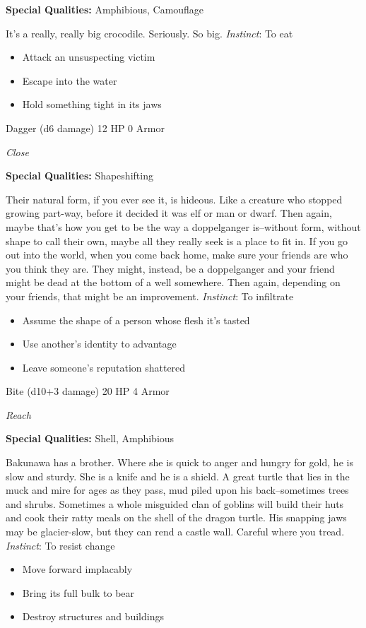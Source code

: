 \textbf{Special Qualities:}
Amphibious, Camouflage

\HRule
It's a really, really big crocodile. Seriously. So big. \emph{Instinct}: To eat
\begin{itemize}
\item Attack an unsuspecting victim
\item Escape into the water
\item Hold something tight in its jaws
\end{itemize}

\HRule
{}

Dagger (d6 damage)\hspace*{\fill} 12 HP 0 Armor

\emph{Close}

\textbf{Special Qualities:}
Shapeshifting

\HRule
Their natural form, if you ever see it, is hideous. Like a creature who stopped growing part-way, before it decided it was elf or man or dwarf. Then again, maybe that's how you get to be the way a doppelganger is--without form, without shape to call their own, maybe all they really seek is a place to fit in. If you go out into the world, when you come back home, make sure your friends are who you think they are. They might, instead, be a doppelganger and your friend might be dead at the bottom of a well somewhere. Then again, depending on your friends, that might be an improvement. \emph{Instinct}: To infiltrate
\begin{itemize}
\item Assume the shape of a person whose flesh it's tasted
\item Use another's identity to advantage
\item Leave someone's reputation shattered
\end{itemize}
\newpage
\HRule
{}

Bite (d10+3 damage)\hspace*{\fill} 20 HP 4 Armor

\emph{Reach}

\textbf{Special Qualities:}
Shell, Amphibious

\HRule
Bakunawa has a brother. Where she is quick to anger and hungry for gold, he is slow and sturdy. She is a knife and he is a shield. A great turtle that lies in the muck and mire for ages as they pass, mud piled upon his back--sometimes trees and shrubs. Sometimes a whole misguided clan of goblins will build their huts and cook their ratty meals on the shell of the dragon turtle. His snapping jaws may be glacier-slow, but they can rend a castle wall. Careful where you tread. \emph{Instinct}: To resist change
\begin{itemize}
\item Move forward implacably
\item Bring its full bulk to bear
\item Destroy structures and buildings
\end{itemize}

